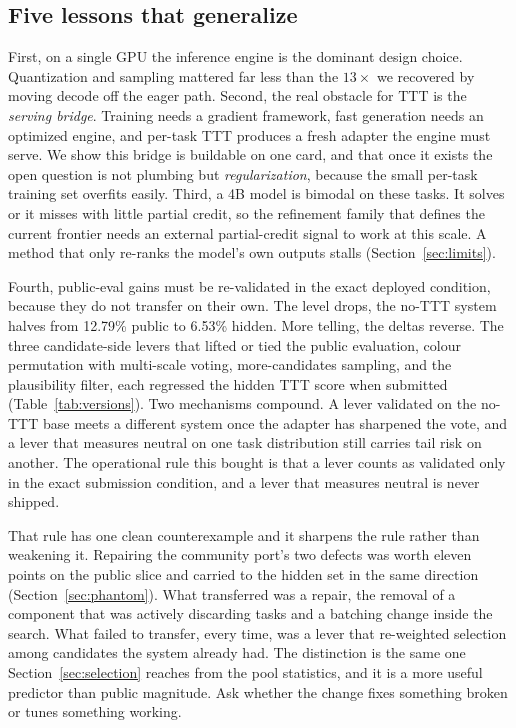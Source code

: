 \documentclass[11pt]{article}
\begin{document}
\subsection{Five lessons that generalize}
\label{sec:lessons}
First, on a single GPU the inference engine is the dominant design choice. Quantization and sampling
mattered far less than the $13\times$ we recovered by moving decode off the eager path. Second, the
real obstacle for TTT is the \emph{serving bridge}. Training needs a gradient framework, fast
generation needs an optimized engine, and per-task TTT produces a fresh adapter the engine must
serve. We show this bridge is buildable on one card, and that once it exists the open question is not
plumbing but \emph{regularization}, because the small per-task training set overfits easily. Third, a
4B model is bimodal on these tasks. It solves or it misses with little partial credit, so the
refinement family that defines the current frontier needs an external partial-credit signal to work at
this scale. A method that only re-ranks the model's own outputs stalls (Section~\ref{sec:limits}).

Fourth, public-eval gains must be re-validated in the exact deployed condition, because they do not
transfer on their own. The level drops, the no-TTT system halves from 12.79\% public to 6.53\% hidden.
More telling, the deltas reverse. The three candidate-side levers that lifted or tied the public
evaluation, colour permutation with multi-scale voting, more-candidates sampling, and the plausibility
filter, each regressed the hidden TTT score when submitted (Table~\ref{tab:versions}). Two mechanisms
compound. A lever validated on the no-TTT base meets a different system once the adapter has sharpened
the vote, and a lever that measures neutral on one task distribution still carries tail risk on
another. The operational rule this bought is that a lever counts as validated only in the exact
submission condition, and a lever that measures neutral is never shipped.

That rule has one clean counterexample and it sharpens the rule rather than weakening it. Repairing the
community port's two defects was worth eleven points on the public slice and carried to the hidden set in
the same direction (Section~\ref{sec:phantom}). What transferred was a repair, the removal of a component
that was actively discarding tasks and a batching change inside the search. What failed to transfer, every
time, was a lever that re-weighted selection among candidates the system already had. The distinction is
the same one Section~\ref{sec:selection} reaches from the pool statistics, and it is a more useful
predictor than public magnitude. Ask whether the change fixes something broken or tunes something working.
\end{document}
